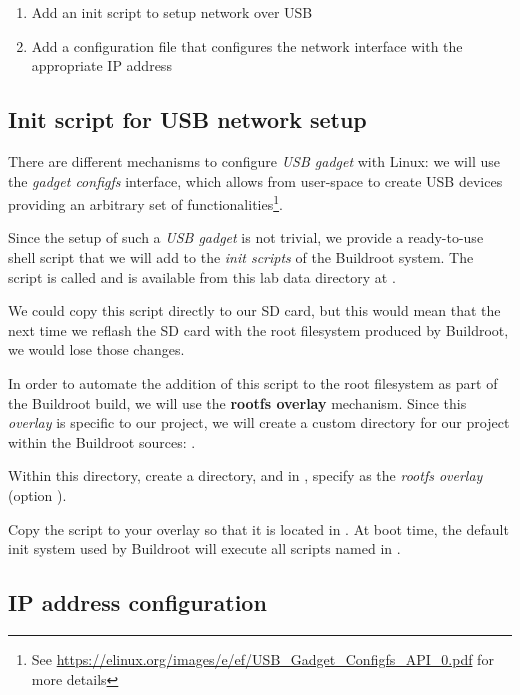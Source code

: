 \begin{enumerate}
\item Add an init script to setup network over USB
\item Add a configuration file that configures the network interface
  with the appropriate IP address
\end{enumerate}

\subsection{Init script for USB network setup}

There are different mechanisms to configure {\em USB gadget} with
Linux: we will use the {\em gadget configfs} interface, which allows
from user-space to create USB devices providing an arbitrary set of
functionalities\footnote{See
  \url{https://elinux.org/images/e/ef/USB_Gadget_Configfs_API_0.pdf}
  for more details}.

Since the setup of such a {\em USB gadget} is not trivial, we provide
a ready-to-use shell script that we will add to the {\em init scripts}
of the Buildroot system. The script is called  and
is available from this lab data directory at
.

We could copy this script directly to our SD card, but this would mean
that the next time we reflash the SD card with the root filesystem
produced by Buildroot, we would lose those changes.

In order to automate the addition of this script to the root
filesystem as part of the Buildroot build, we will use the {\bf rootfs
  overlay} mechanism. Since this {\em overlay} is specific to our
project, we will create a custom directory for our project within the
Buildroot sources: .

Within this directory, create a  directory, and
in , specify
 as the {\em rootfs
  overlay} (option ).

Copy the  script to your overlay so that it is
located in
. At
boot time, the default init system used by Buildroot will execute all
scripts named  in .

\subsection{IP address configuration}

